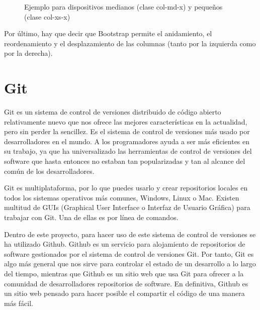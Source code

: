 \documentclass[a4paper, 12pt]{book}
\begin{document}
\begin{figure}[htbp] 
  \label{figura:bootstrap1}
  \centering
  \caption{Ejemplo para dispositivos medianos (clase col-md-x) y peque\~nos (clase col-xs-x)}
\end{figure}

Por \'ultimo, hay que decir que Bootstrap permite el anidamiento, el reordenamiento y el desplazamiento de las columnas 
(tanto por la izquierda como por la derecha).

\section{Git}
\label{sec:git}
Git es un sistema de control de versiones distribuido de c\'odigo abierto relativamente nuevo que nos ofrece las mejores caracter\'isticas en la 
actualidad, pero sin perder la sencillez. Es el sistema de control de versiones m\'as usado por desarrolladores en el mundo. 
A los programadores ayuda a ser m\'as eficientes en su trabajo, ya que ha universalizado las herramientas de control de versiones del software que 
hasta entonces no estaban tan popularizadas y tan al alcance del com\'un de los desarrolladores.

Git es multiplataforma, por lo que puedes usarlo y crear repositorios locales en todos los sistemas operativos m\'as comunes, Windows, Linux o Mac. 
Existen multitud de GUIs (Graphical User Interface o Interfaz de Usuario Gr\'afica) para trabajar con Git. Una de ellas es por l\'inea de comandos.

Dentro de este proyecto, para hacer uso de este sistema de control de versiones se ha utilizado Github. Github es un servicio para alojamiento de 
repositorios de software gestionados por el sistema de control de versiones Git. Por tanto, Git es algo m\'as general que nos sirve para controlar 
el estado de un desarrollo a lo largo del tiempo, mientras que Github es un sitio web que usa Git para ofrecer a la comunidad de desarrolladores 
repositorios de software. En definitiva, Github es un sitio web pensado para hacer posible el compartir el c\'odigo de una manera m\'as f\'acil.
\end{document}
